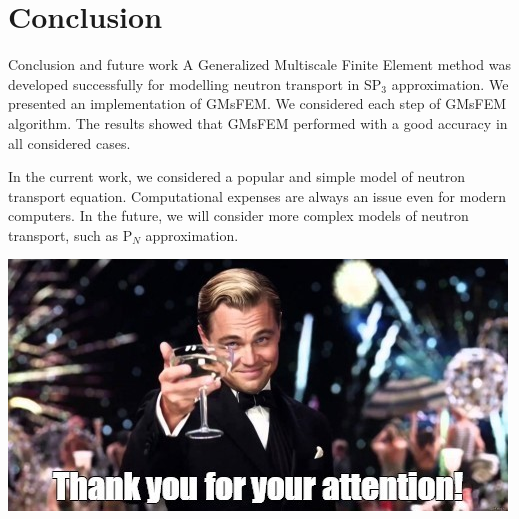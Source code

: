 \documentclass[10pt,pdf,hyperref={unicode}]{beamer}
\begin{document}
\section*{Conclusion}

\begin{frame}{Conclusion and future work}
	A Generalized Multiscale Finite Element method was developed successfully for modelling neutron transport in SP$_3$ approximation.
	We presented an implementation of GMsFEM. 
	We considered each step of GMsFEM algorithm.
	The results showed that GMsFEM performed with a good accuracy in all considered cases. 
	
	\vspace{1em}
	
	In the current work, we considered a popular and simple model of neutron transport equation.
	Computational expenses are always an issue even for modern computers.
	In the future, we will consider more complex models of neutron transport, such as P$_N$ approximation.
\end{frame}

\begin{frame}
	\includegraphics[width=1\linewidth]{thanks.jpg} 
\end{frame}
\end{document}
